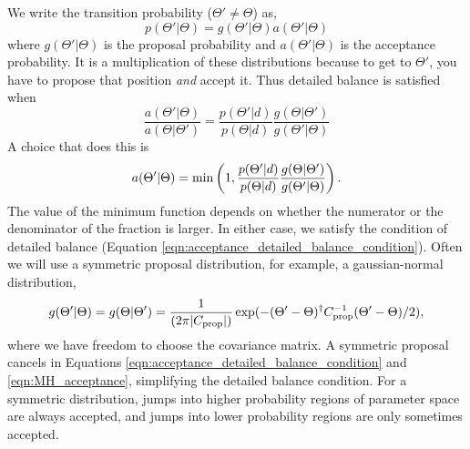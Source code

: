 We write the transition probability ($\Theta' \neq \Theta$) as,
\begin{equation}
  p(\Theta'|\Theta) = g(\Theta'|\Theta) a(\Theta'|\Theta)
\end{equation}
where $g(\Theta'|\Theta)$ is the proposal probability and $a(\Theta'|\Theta)$ is the acceptance probability.  It is a multiplication of these distributions because to get to $\Theta'$, you have to propose that position \textit{and} accept it.
Thus detailed balance is satisfied when
\begin{equation}
  \frac{a(\Theta'|\Theta)} { a(\Theta|\Theta')} =  \frac{p(\Theta'|d) }{p(\Theta|d)} \frac{g(\Theta|\Theta')}{g(\Theta'|\Theta)} \label{eqn:acceptance_detailed_balance_condition}
\end{equation}
A choice that does this is
\begin{equation}
  a(\Theta'|\Theta) = {\rm  min} \left( 1,   \frac{p(\Theta'|d) }{p(\Theta|d)} \frac{g(\Theta|\Theta')}{g(\Theta'|\Theta)}  \right). \label{eqn:MH_acceptance}
\end{equation}
The value of the minimum function depends on whether the numerator or the denominator of the fraction is larger.  In either case, we satisfy the condition of detailed balance (Equation \ref{eqn:acceptance_detailed_balance_condition}).  Often we will use a symmetric proposal distribution, for example, a gaussian-normal distribution,
\begin{equation}
  g(\Theta'|\Theta) =g(\Theta|\Theta') = \frac{1}{(2\pi |C_{\rm prop}|)} \exp (-(\Theta'- \Theta)^\dag C^{-1}_{\rm prop}(\Theta'- \Theta)/2), \end{equation}
where we have freedom to choose the covariance matrix.
A symmetric proposal cancels in Equations \ref{eqn:acceptance_detailed_balance_condition} and \ref{eqn:MH_acceptance}, simplifying the detailed balance condition.  For a symmetric distribution, jumps into higher probability regions of parameter space are always accepted, and jumps into lower probability regions are only sometimes accepted.

